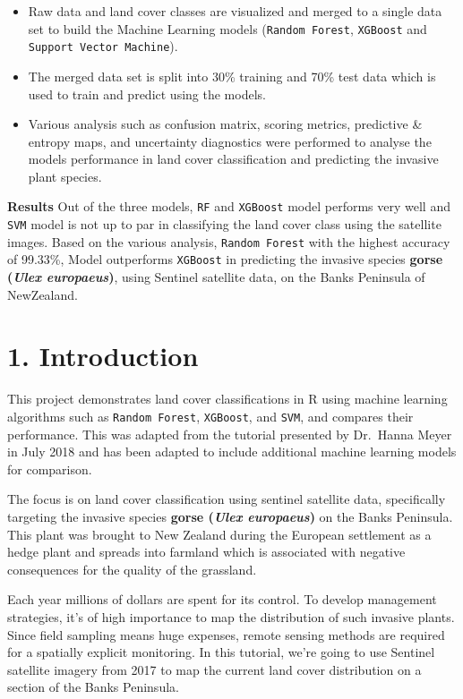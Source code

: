 \documentclass[
]{article}
\begin{document}
\begin{itemize}
\item
  Raw data and land cover classes are visualized and merged to a single
  data set to build the Machine Learning models
  (\texttt{Random\ Forest}, \texttt{XGBoost} and
  \texttt{Support\ Vector\ Machine}).
\item
  The merged data set is split into 30\% training and 70\% test data
  which is used to train and predict using the models.
\item
  Various analysis such as confusion matrix, scoring metrics, predictive
  \& entropy maps, and uncertainty diagnostics were performed to analyse
  the models performance in land cover classification and predicting the
  invasive plant species.
\end{itemize}

\textbf{Results} Out of the three models, \texttt{RF} and
\texttt{XGBoost} model performs very well and \texttt{SVM} model is not
up to par in classifying the land cover class using the satellite
images. Based on the various analysis, \texttt{Random\ Forest} with the
highest accuracy of 99.33\%, Model outperforms \texttt{XGBoost} in
predicting the invasive species \textbf{gorse (\emph{Ulex europaeus})},
using Sentinel satellite data, on the Banks Peninsula of NewZealand.

\section{1. Introduction}\label{introduction}

This project demonstrates land cover classifications in R using machine
learning algorithms such as \texttt{Random\ Forest}, \texttt{XGBoost},
and \texttt{SVM}, and compares their performance. This was adapted from
the tutorial presented by Dr.~Hanna Meyer in July 2018 and has been
adapted to include additional machine learning models for comparison.

The focus is on land cover classification using sentinel satellite data,
specifically targeting the invasive species \textbf{gorse (\emph{Ulex
europaeus})} on the Banks Peninsula. This plant was brought to New
Zealand during the European settlement as a hedge plant and spreads into
farmland which is associated with negative consequences for the quality
of the grassland.

Each year millions of dollars are spent for its control. To develop
management strategies, it's of high importance to map the distribution
of such invasive plants. Since field sampling means huge expenses,
remote sensing methods are required for a spatially explicit monitoring.
In this tutorial, we're going to use Sentinel satellite imagery from
2017 to map the current land cover distribution on a section of the
Banks Peninsula.
\end{document}
